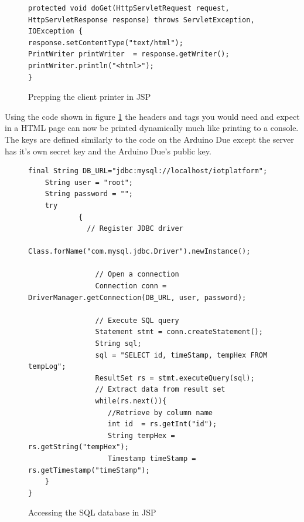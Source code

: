 \begin{figure}[H]
\begin{lstlisting}[style=Java]
protected void doGet(HttpServletRequest request, HttpServletResponse response) throws ServletException, IOException {
response.setContentType("text/html");
PrintWriter printWriter  = response.getWriter();
printWriter.println("<html>");
}
\end{lstlisting}
\caption{Prepping the client printer in JSP}
\label{snip:clientprinterjsp}
\end{figure}

Using the code shown in figure \ref{snip:clientprinterjsp} the headers and tags you would need and expect in a HTML page can now be printed dynamically much like printing to a console. The keys are defined similarly to the code on the Arduino Due except the server has it's own secret key and the Arduino Due's public key.

\begin{figure}[H]
\begin{lstlisting}[style=Java]
	final String DB_URL="jdbc:mysql://localhost/iotplatform";
	String user = "root"; 
	String password = "";
	try
	        {
	          // Register JDBC driver
	          Class.forName("com.mysql.jdbc.Driver").newInstance();

	            // Open a connection
	            Connection conn = DriverManager.getConnection(DB_URL, user, password);

	            // Execute SQL query
	            Statement stmt = conn.createStatement();
	            String sql;
	            sql = "SELECT id, timeStamp, tempHex FROM tempLog";
	            ResultSet rs = stmt.executeQuery(sql);
	            // Extract data from result set
	            while(rs.next()){
	               //Retrieve by column name
	               int id  = rs.getInt("id");
	               String tempHex = rs.getString("tempHex");
	               Timestamp timeStamp = rs.getTimestamp("timeStamp");
	}
}
\end{lstlisting}
\caption{Accessing the SQL database in JSP}
\label{snip:jspcode1}
\end{figure}

